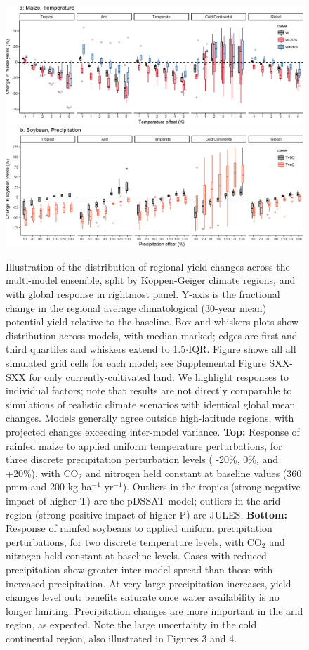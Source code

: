 \documentclass[gmd, manuscript]{copernicus} %
\begin{document}
\begin{figure}[ht]
  \centering
  \includegraphics[width=15cm]{figures/maize_sim_CG_T.png}
  \includegraphics[width=15cm]{figures/soy_sim_CG_W.png}
  \caption{
  Illustration of the distribution of regional yield changes across the multi-model ensemble, split by K\"{o}ppen-Geiger climate regions, and with global response in rightmost panel.
  Y-axis is the fractional change in the regional average climatological (30-year mean) potential yield relative to the baseline.
  Box-and-whiskers plots show distribution across models, with median marked; edges are first and third quartiles and whiskers extend to 1.5$\cdot$IQR.
  Figure shows all all simulated grid cells for each model; see Supplemental Figure SXX-SXX for only currently-cultivated land. We highlight responses to individual factors; note that results are not directly comparable to simulations of realistic climate scenarios with identical global mean changes.  
  Models generally agree outside high-latitude regions, with projected changes exceeding inter-model variance.
  \textbf{Top:} Response of rainfed maize to applied uniform temperature perturbations, for three discrete precipitation perturbation levels ( -20\%, 0\%, and +20\%), with CO$_2$ and nitrogen held constant at baseline values (360 pmm and 200 kg ha$^{-1}$ yr$^{-1}$).
  Outliers in the tropics (strong negative impact of higher T) are the pDSSAT model; outliers in the arid region (strong positive impact of higher P) are JULES.
  \textbf{Bottom:} 
  Response of rainfed soybeans to applied uniform precipitation perturbations, for two discrete temperature levels, with CO$_2$ and nitrogen held constant at baseline levels. 
  Cases with reduced precipitation show greater inter-model spread than those with increased precipitation.
  At very large precipitation increases, yield changes level out: benefits saturate once water availability is no longer limiting.
  Precipitation changes are more important in the arid region, as expected. 
  Note the large uncertainty in the cold continental region, also illustrated in Figures 3 and 4.
  }
  \label{fig:maizerice}
\end{figure}
\end{document}
